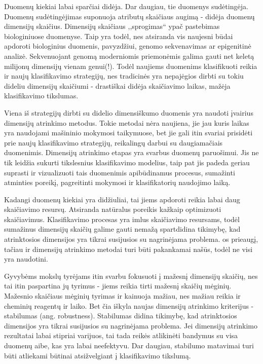 Duomenų kiekiai labai sparčiai didėja. Dar daugiau, tie duomenys sudėtingėja. 
Duomenų sudėtingėjimas suponuoja atributų skaičiaus augimą - didėja duomenų
dimensijų skaičius. Dimensijų skaičiaus ,,sprogimas`` ypač pastebimas 
biologiniuose duomenyse. Taip yra todėl, nes atsiranda vis naujesni būdai 
apdoroti biologinius duomenis, pavyzdžiui, genomo sekvenavimas ar epigenitinė
analizė. Sekvenuojant genomą moderniomis priemonėmis galima gauti net
keletą milijonų dimensijų vienam genui(!). Todėl naujiems duomenims klasifikuoti
reikia ir naujų klasifikavimo strategijų, nes tradicinės yra nepajėgios dirbti
su tokiu dideliu dimensijų skaičiumi - drastiškai didėja skaičiavimo laikas, 
mažėja klasifikavimo tikslumas.
 
Viena iš strategijų dirbti su didelio dimensiškumo duomenis yra naudoti įvairius
dimensijų atrinkimo metodus. Tokie metodai nėra naujiena, jie jau kuris laikas
yra naudojami mašininio mokymosi taikymuose, bet jie gali itin svariai 
prisidėti prie naujų klasifikavimo strategijų, reikalingų darbui su daugiamačiais 
duomenimis. Dimensijų atrinkimo etapas yra
svarbus duomenų paruošimui. Jis ne tik leidžia sukurti tikslesnius klasifikavimo
modelius, taip pat jis padeda geriau suprasti ir vizualizuoti tais duomenimis
apibūdinamus procesus, sumažinti atminties poreikį, pagreitinti mokymosi ir 
klasifikatorių naudojimo laiką. 

Kadangi duomenų kiekiai yra didžiuliai, tai jiems apdoroti reikia labai daug
skaičiavimo resursų. Atsiranda natūralus poreikis kažkaip optimizuoti 
skaičiavimus. Klasifikavimo procesas yra imlus skaičiavimo resursams, todėl 
sumažinus dimensijų skaičių galime gauti nemažą spartdidina tikimybę, kad atrinktosios 
dimensijos yra tikrai susijusios su nagrinėjama problema. os prieaugį, tačiau ir 
dimensijų atrinkimo metodai turi būti pakankamai našūs, todėl ne visi yra
naudotini.

Gyvybėms mokslų tyrėjams itin svarbu fokusuoti į mažesnį dimensijų skaičių,
nes tai itin paspartina jų tyrimus - jiems reikia tirti mažesnį skaičių 
mėginių. Mažesnio skaičiaus mėginių tyrimas ir kainuoja mažiau, nes mažiau 
reikia ir cheminių reagentų ir laiko. Bet čia iškyla naujas dimensijų atrinkimo 
kriterijus - stabilumas (ang. robustness). Stabilumas didina tikimybę, kad atrinktosios 
dimensijos yra tikrai susijusios su nagrinėjama problema. Jei dimensijų atrinkimo
rezultatai labai stipriai varijuos, tai tada reikės atlikinėti bandymus su visa
duomenų aibe, kas yra labai neefektyvu. Dar daugiau, stabilumo matavimai turi
būti atliekami būtinai atsižvelgiant į klasifikavimo tikslumą.

